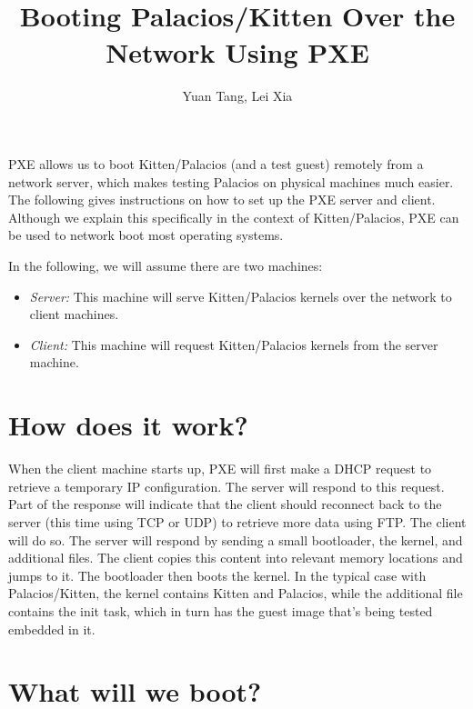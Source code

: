 \documentclass[11pt]{article}
\begin{document}
\title{\ \\ \LARGE\bf
Booting Palacios/Kitten Over the Network Using PXE
}

\author{Yuan Tang, Lei Xia}

\maketitle

PXE allows us to boot Kitten/Palacios (and a test guest) remotely from
a network server, which makes testing Palacios on physical machines
much easier.  The following gives instructions on how to set up the
PXE server and client.  Although we explain this specifically in the
context of Kitten/Palacios, PXE can be used to network boot most
operating systems.


In the following, we will assume there are two machines:
\begin{itemize}
\item {\em Server:}  This machine will serve Kitten/Palacios kernels over the network to client machines.
\item {\em Client:}  This machine will request Kitten/Palacios kernels from the server machine.
\end{itemize}

\section{How does it work?}

When the client machine starts up, PXE will first make a DHCP request
to retrieve a temporary IP configuration.   The server will respond to
this request.   Part of the response will indicate that the client
should reconnect back to the server (this time using TCP or UDP) to
retrieve more data using FTP.  The client will do so.  The server will
respond by sending a small bootloader, the kernel, and additional
files.   The client copies this content into relevant memory locations
and jumps to it.   The bootloader then boots the kernel.    In the
typical case with Palacios/Kitten, the kernel contains Kitten and
Palacios, while the additional file contains the init task, which in
turn has the guest image that's being tested embedded in it. 



\section{What will we boot?}
\end{document}
